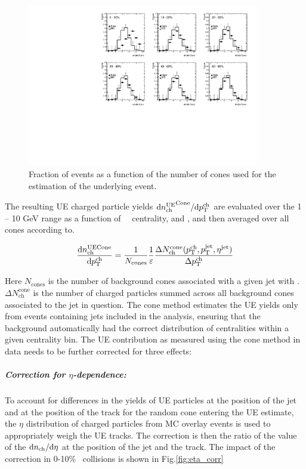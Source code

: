 \begin{figure}[ht]
     \centerline{
        \includegraphics[width=0.9\textwidth]{figures/main/UE/cone_stats}
     }
     \caption{Fraction of events as a function of the number of cones used for the estimation of the underlying event.}
     \label{fig:cone_stats}
  \end{figure}   

The resulting UE charged particle yields $\mathrm{d} \mbox{$n_{\mathrm{ch}}^{\mathrm{UE}}$}^{\mathrm{Cone}}/ \mathrm{d} \mbox{$p_{{\mathrm{T}}}^{\mathrm{ch}}$}$ are evaluated over the 1 -- 10 GeV range as a function of \pt\, \ptjet\, centrality, and \rvar, and then averaged over all cones according to.

 \begin{eqnarray}
\frac{\mathrm{d} n_{\mathrm{ch}}^{\mathrm{UE Cone}}}{\mathrm{d} \mbox{$p_{{\mathrm{T}}}^{\mathrm{ch}}$}}  = \frac{1}{N_{\mathrm{cones}}} \frac{1}{\varepsilon} \frac{\Delta N^{\mathrm{cone}}_{\mathrm{ch}} (\mbox{$p_{{\mathrm{T}}}^{\mathrm{ch}}$}, \mbox{$p_{\mathrm{T}}^{\mathrm{jet}}$}, \mbox{$\eta^{\mathrm{jet}}$})}{\Delta \mbox{$p_{{\mathrm{T}}}^{\mathrm{ch}}$}}
 \end{eqnarray}

Here $N_{\mathrm{cones}}$ is the number of background cones associated with a given jet with \ptjet. $\Delta N^{\mathrm{cone}}_{\mathrm{ch}}$ is the number of charged particles summed across all background cones associated to the jet in question. The cone method estimates the UE yields only from events containing jets included in the analysis, ensuring that the background automatically had the correct distribution of centralities within a given centrality bin. The UE contribution as measured using the cone method in data needs to be further corrected for three effects:
 \subparagraph{Correction for $\eta$-dependence: } To account for differences in the yields of UE particles at the position of the jet and at the position of the track for the random cone entering the UE estimate, the $\eta$ distribution of charged particles from MC overlay events is used to appropriately weigh the UE tracks. The correction is then the ratio of the value of the $\mathrm{d} \mbox{$n_{\mathrm{ch}}$} / \mathrm{d}\eta$ at the position of the jet and the track. The impact of the correction in 0-10\% \pbpb\ collisions is shown in Fig.\ref{fig:eta_corr}

